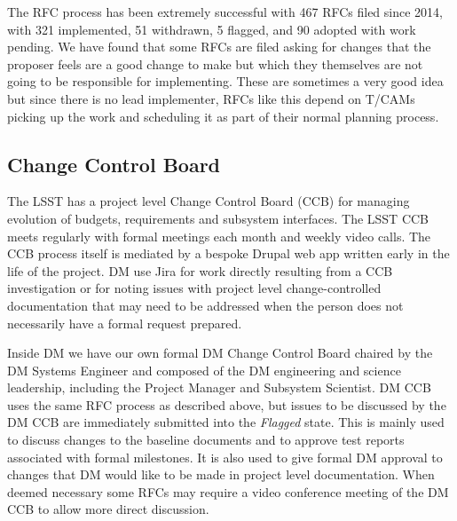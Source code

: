 The RFC process has been extremely successful with 467 RFCs filed since 2014, with 321 implemented, 51 withdrawn, 5 flagged, and 90 adopted with work pending.
We have found that some RFCs are filed asking for changes that the proposer feels are a good change to make but which they themselves are not going to be responsible for implementing.
These are sometimes a very good idea but since there is no lead implementer, RFCs like this depend on T/CAMs picking up the work and scheduling it as part of their normal planning process.

\subsection{Change Control Board}
\label{sec:ccb}

The LSST has a project level Change Control Board (CCB) for managing evolution of budgets, requirements and subsystem interfaces.
The LSST CCB meets regularly with formal meetings each month and weekly video calls.
The CCB process itself is mediated by a bespoke Drupal web app written early in the life of the project.
DM  use Jira for work directly resulting from a CCB investigation or for noting issues with project level change-controlled documentation that may need to be addressed when the person does not necessarily have a formal request prepared.

Inside DM we have our own formal DM Change Control Board
chaired by the DM Systems Engineer and composed of the DM engineering and science leadership, including the Project Manager and Subsystem Scientist.
DM CCB uses the same RFC process as described above, but issues to be discussed by the DM CCB are immediately submitted into the \emph{Flagged} state.
This is mainly used to discuss changes to the baseline documents and to approve test reports associated with formal milestones.
It is also used to give formal DM approval to changes that DM would like to be made in project level documentation.
When deemed necessary some RFCs may require a video conference meeting of the DM CCB to allow more direct discussion.
